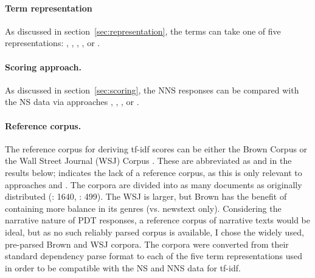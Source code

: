 \paragraph{Term representation} As discussed in
section~\ref{sec:representation}, the terms can take one of five
representations: , , , ,
or .

\paragraph{Scoring approach.} As discussed in
section~\ref{sec:scoring}, the NNS responses can be
compared with the NS data via approaches , , , or .

\paragraph{Reference corpus.} The reference corpus for deriving tf-idf
scores can be either the Brown Corpus \citep{kucera:francis:67} or the
Wall Street Journal (WSJ) Corpus \citep{marcus-et-al:93}. These are
abbreviated as  and  in the results
below;  indicates the lack of a reference corpus, as this is
only relevant to approaches  and
. The corpora are divided into as many documents as
originally distributed (: 1640, : 499). The WSJ is
larger, but Brown has the benefit of containing more balance in its
genres (vs. newstext only). Considering the narrative nature of PDT
responses, a reference corpus of narrative texts would be ideal, but as no such reliably parsed corpus is available, I chose the widely used, pre-parsed Brown and WSJ corpora. The corpora were converted from their standard dependency parse format to each of the five term representations used in order to be compatible with the NS and NNS data for tf-idf.

%
